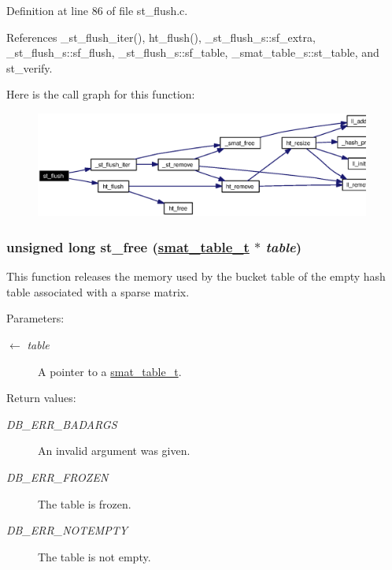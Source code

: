 Definition at line 86 of file st\_\-flush.c.

References \_\-st\_\-flush\_\-iter(), ht\_\-flush(), \_\-st\_\-flush\_\-s::sf\_\-extra, \_\-st\_\-flush\_\-s::sf\_\-flush, \_\-st\_\-flush\_\-s::sf\_\-table, \_\-smat\_\-table\_\-s::st\_\-table, and st\_\-verify.

Here is the call graph for this function:\begin{figure}[H]
\begin{center}
\leavevmode
\includegraphics[width=313pt]{group__dbprim__smat_ga17_cgraph}
\end{center}
\end{figure}
\hypertarget{group__dbprim__smat_ga19}{
\subsubsection[st\_\-free]{\setlength{\rightskip}{0pt plus 5cm}unsigned long st\_\-free (\hyperlink{struct__smat__table__s}{smat\_\-table\_\-t} $\ast$ {\em table})}}
\label{group__dbprim__smat_ga19}


This function releases the memory used by the bucket table of the empty hash table associated with a sparse matrix.

\begin{Desc}
\item[Parameters:]
\begin{description}
\item[\mbox{$\leftarrow$} {\em table}]A pointer to a \hyperlink{group__dbprim__smat_ga0}{smat\_\-table\_\-t}.\end{description}
\end{Desc}
\begin{Desc}
\item[Return values:]
\begin{description}
\item[{\em DB\_\-ERR\_\-BADARGS}]An invalid argument was given. \item[{\em DB\_\-ERR\_\-FROZEN}]The table is frozen. \item[{\em DB\_\-ERR\_\-NOTEMPTY}]The table is not empty.\end{description}
\end{Desc}


